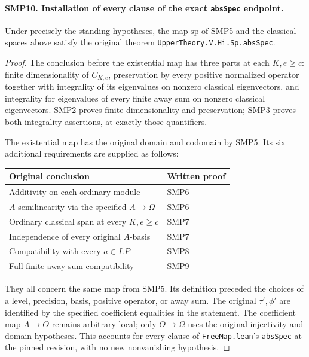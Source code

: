 \documentclass[11pt,a4paper]{article}
\numberwithin{equation}{section}
\theoremstyle{remark}\newtheorem{remark}[theorem]{Remark}
\begin{document}
\paragraph{SMP10. Installation of every clause of the exact \texttt{abs\allowbreak Spec} endpoint.}
\label{claim:SMP10}
Under precisely the standing hypotheses, the map
$\mathrm{sp}$ of SMP5 and the classical spaces above
satisfy the original theorem
\texttt{Upper\allowbreak Theory.\allowbreak V.\allowbreak Hi.\allowbreak Sp.\allowbreak abs\allowbreak Spec}.
\begin{proof}
The conclusion before the existential map has three
parts at each $K,\allowbreak{} e\geq c$: finite dimensionality of
$C_{K,\allowbreak{} e}$, preservation by every positive normalized
operator together with integrality of its eigenvalues
on nonzero classical eigenvectors, and integrality
for eigenvalues of every finite away sum on nonzero
classical eigenvectors.  SMP2 proves finite
dimensionality and preservation; SMP3 proves both
integrality assertions, at exactly those quantifiers.

The existential map has the original domain and
codomain by SMP5.  Its six additional requirements
are supplied as follows:
\begin{center}
\begin{tabular}{ll}
Original conclusion & Written proof \\
\hline
Additivity on each ordinary module & SMP6 \\
$A$-semilinearity via the specified $A\to\Omega$ & SMP6 \\
Ordinary classical span at every $K,\allowbreak{} e\geq c$ & SMP7 \\
Independence of every original $A$-basis & SMP7 \\
Compatibility with every $a\in I.P$ & SMP8 \\
Full finite away-sum compatibility & SMP9
\end{tabular}
\end{center}
They all concern the same map from SMP5.  Its definition
preceded the choices of a level, precision, basis,
positive operator, or away sum.  The original
$\tau',\phi'$ are identified by the specified
coefficient equalities in the statement.  The
coefficient map $A\to O$ remains arbitrary local;
only $O\to\Omega$ uses the original injectivity and
domain hypotheses.  This accounts for every clause
of \texttt{Free\allowbreak Map.\allowbreak lean}'s \texttt{abs\allowbreak Spec} at the
pinned revision, with no new nonvanishing hypothesis.
\end{proof}
\end{document}

